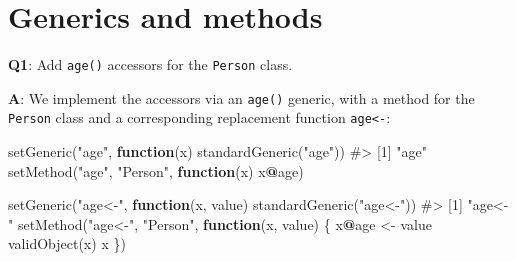 \documentclass[
]{krantz}
\makeatletter
\newenvironment{Shaded}{\begin{snugshade}}{\end{snugshade}}
\newcommand{\CommentTok}[1]{\textcolor[rgb]{0.56,0.35,0.01}{\textit{#1}}}
\newcommand{\ControlFlowTok}[1]{\textcolor[rgb]{0.13,0.29,0.53}{\textbf{#1}}}
\newcommand{\DataTypeTok}[1]{\textcolor[rgb]{0.13,0.29,0.53}{#1}}
\newcommand{\DecValTok}[1]{\textcolor[rgb]{0.00,0.00,0.81}{#1}}
\newcommand{\KeywordTok}[1]{\textcolor[rgb]{0.13,0.29,0.53}{\textbf{#1}}}
\newcommand{\NormalTok}[1]{#1}
\newcommand{\OperatorTok}[1]{\textcolor[rgb]{0.81,0.36,0.00}{\textbf{#1}}}
\newcommand{\StringTok}[1]{\textcolor[rgb]{0.31,0.60,0.02}{#1}}
\newenvironment{kframe}{%
\medskip{}
\setlength{\fboxsep}{.8em}
 \def\at@end@of@kframe{}%
 \ifinner\ifhmode%
  \def\at@end@of@kframe{\end{minipage}}%
  \begin{minipage}{\columnwidth}%
 \fi\fi%
 \def\FrameCommand##1{\hskip\@totalleftmargin \hskip-\fboxsep
 \colorbox{shadecolor}{##1}\hskip-\fboxsep
     \hskip-\linewidth \hskip-\@totalleftmargin \hskip\columnwidth}%
 \MakeFramed {\advance\hsize-\width
   \@totalleftmargin\z@ \linewidth\hsize
   \@setminipage}}%
 {\par\unskip\endMakeFramed%
 \at@end@of@kframe}
\renewenvironment{Shaded}{\begin{kframe}}{\end{kframe}}
\renewcommand{\KeywordTok} [1]{\textcolor[rgb]{0.00,0.44,0.13}{{#1}}}
\renewcommand{\DataTypeTok}[1]{\textcolor[rgb]{0.56,0.13,0.00}{{#1}}}
\renewcommand{\DecValTok}  [1]{\textcolor[rgb]{0.25,0.63,0.44}{{#1}}}
\renewcommand{\StringTok}  [1]{\textcolor[rgb]{0.25,0.44,0.63}{{#1}}}
\renewcommand{\CommentTok} [1]{\textcolor[rgb]{0.38,0.63,0.69}{{#1}}}
\renewcommand{\NormalTok}  [1]{{#1}}
\makeatother
\begin{document}
\begin{Shaded}
\end{Shaded}

\hypertarget{generics-and-methods-1}{%
\section{Generics and methods}\label{generics-and-methods-1}}

\textbf{{Q1}}: Add \texttt{age()} accessors for the \texttt{Person} class.

\textbf{{A}}: We implement the accessors via an \texttt{age()} generic, with a method for the \texttt{Person} class and a corresponding replacement function \texttt{age\textless{}-}:

\begin{Shaded}
\begin{Highlighting}[]
\KeywordTok{setGeneric}\NormalTok{(}\StringTok{"age"}\NormalTok{, }\ControlFlowTok{function}\NormalTok{(x) }\KeywordTok{standardGeneric}\NormalTok{(}\StringTok{"age"}\NormalTok{))}
\CommentTok{#> [1] "age"}
\KeywordTok{setMethod}\NormalTok{(}\StringTok{"age"}\NormalTok{, }\StringTok{"Person"}\NormalTok{, }\ControlFlowTok{function}\NormalTok{(x) x}\OperatorTok{@}\NormalTok{age)}

\KeywordTok{setGeneric}\NormalTok{(}\StringTok{"age<-"}\NormalTok{, }\ControlFlowTok{function}\NormalTok{(x, value) }\KeywordTok{standardGeneric}\NormalTok{(}\StringTok{"age<-"}\NormalTok{))}
\CommentTok{#> [1] "age<-"}
\KeywordTok{setMethod}\NormalTok{(}\StringTok{"age<-"}\NormalTok{, }\StringTok{"Person"}\NormalTok{, }\ControlFlowTok{function}\NormalTok{(x, value) \{}
\NormalTok{  x}\OperatorTok{@}\NormalTok{age <-}\StringTok{ }\NormalTok{value}
  \KeywordTok{validObject}\NormalTok{(x)}
\NormalTok{  x}
\NormalTok{\})}
\end{Highlighting}
\end{Shaded}
\end{document}
